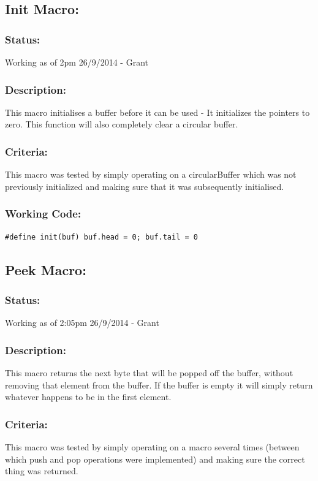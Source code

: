 \documentclass[]{report}
\begin{document}
\subsection{Init Macro:}
\subsubsection{Status:}
Working as of 2pm 26/9/2014 - Grant

\subsubsection{Description:}
This macro initialises a buffer before it can be used - It initializes the pointers to zero. This function will also completely clear a circular buffer.

\subsubsection{Criteria:}
This macro was tested by simply operating on a circularBuffer which was not previously initialized and making sure that it was subsequently initialised.

\subsubsection{Working Code:}
\begin{lstlisting}
#define init(buf) buf.head = 0; buf.tail = 0
\end{lstlisting}

\subsection{Peek Macro:}
\subsubsection{Status:}
Working as of 2:05pm 26/9/2014 - Grant

\subsubsection{Description:}
This macro returns the next byte that will be popped off the buffer, without removing that element from the buffer. If the buffer is empty it will simply return whatever happens to be in the first element.

\subsubsection{Criteria:}
This macro was tested by simply operating on a macro several times (between which push and pop operations were implemented) and making sure the correct thing was returned.
\end{document}

